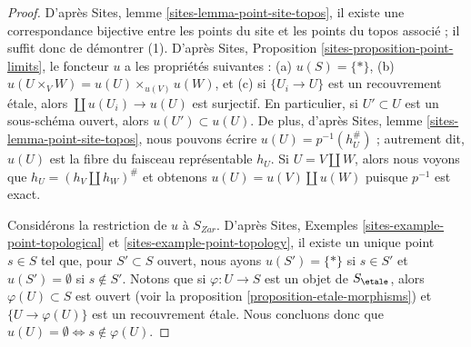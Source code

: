 \begin{proof}
D'apr\`es
Sites, lemme \ref{sites-lemma-point-site-topos},
il existe une correspondance bijective entre les points du site et les points
du topos associ\'e ; il suffit donc de d\'emontrer (1).
D'apr\`es
Sites, Proposition \ref{sites-proposition-point-limits},
le foncteur $u$ a les propri\'et\'es suivantes :
(a) $u(S) = \{*\}$, (b) $u(U \times_V W) = u(U) \times_{u(V)} u(W)$, et
(c) si $\{U_i \to U\}$ est un recouvrement \'etale, alors
$\coprod u(U_i) \to u(U)$ est surjectif.
En particulier, si $U' \subset U$ est un sous-sch\'ema ouvert,
alors $u(U') \subset u(U)$. De plus, d'apr\`es
Sites, lemme \ref{sites-lemma-point-site-topos},
nous pouvons \'ecrire $u(U) = p^{-1}(h_U^\#)$ ; autrement dit, $u(U)$ est la
fibre du faisceau repr\'esentable $h_U$. Si
$U = V \amalg W$, alors nous voyons que $h_U = (h_V \amalg h_W)^\#$ et obtenons
$u(U) = u(V) \amalg u(W)$ puisque $p^{-1}$ est exact.

\medskip\noindent
Consid\'erons la restriction de $u$ \`a $S_{Zar}$. D'apr\`es
Sites, Exemples \ref{sites-example-point-topological} et
\ref{sites-example-point-topology},
il existe un unique point $s \in S$ tel que, pour $S' \subset S$ ouvert, nous
ayons $u(S') = \{*\}$ si $s \in S'$ et $u(S') = \emptyset$ si $s \not \in S'$.
Notons que si $\varphi : U \to S$ est un objet de $S_\etale$, alors
$\varphi(U) \subset S$ est ouvert (voir la
proposition \ref{proposition-etale-morphisms})
et $\{U \to \varphi(U)\}$ est un recouvrement \'etale. Nous concluons donc que
$u(U) = \emptyset \Leftrightarrow s \not \in \varphi(U)$.


\end{proof}
